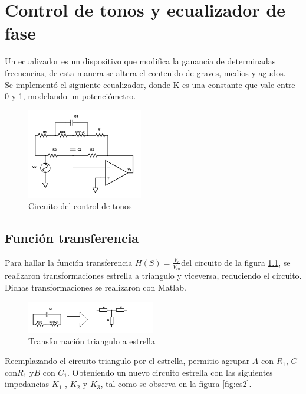 \documentclass[../../tc_tp3_main.tex]{subfiles}
\begin{document}
\chapter{Control de tonos y ecualizador de fase}

Un ecualizador es un dispositivo que modifica la ganancia de determinadas frecuencias, de esta manera se altera el contenido de graves, medios y agudos.
\\
Se implementó el siguiente ecualizador, donde K es una constante que vale entre 0 y 1, modelando un potenciómetro.

\begin{figure}[H]
\centering
\includegraphics[width=0.45\textwidth]{imagenes/circuitoControlTonos.png}
\caption{Circuito del control de tonos} \label{fig:cct}
\end{figure}




\section{Función transferencia}

Para hallar la función transferencia $H(S)=\frac{V_{o}}{V_{in}} $del circuito de la figura \ref{fig:cct}, se realizaron transformaciones estrella a triangulo y viceversa, reduciendo el circuito. Dichas transformaciones se realizaron con Matlab.



\begin{figure}[H]
\centering
\includegraphics[width=0.5\textwidth]{imagenes/simpl1.png}
\caption{Transformación triangulo a estrella} \label{fig:cs1}
\end{figure}

Reemplazando el circuito triangulo por el estrella, permitio agrupar $A$ con $R_1$, $C$ con$ R_1$ y$ B$ con $C_1$. Obteniendo un nuevo circuito estrella con las siguientes impedancias $ K_1$ , $K_2$ y  $K_3$, tal como se observa en la figura \ref{fig:cs2}.
\end{document}
